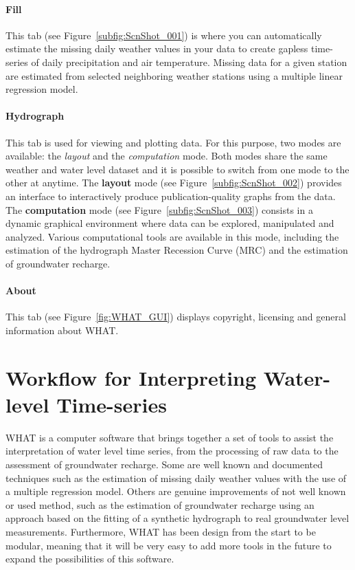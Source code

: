 \documentclass[WHATMANUAL.tex]{subfiles}
\begin{document}
\paragraph{Fill} This tab (see Figure~\ref{subfig:ScnShot_001}) is where you can automatically estimate the missing daily weather values in your data to create gapless time-series of daily precipitation and air temperature. Missing data for a given station are estimated from selected neighboring weather stations using a multiple linear regression model.

\paragraph{Hydrograph} This tab is used for viewing and plotting data. For this purpose, two modes are available: the \emph{layout} and the \emph{computation} mode. Both modes share the same weather and water level dataset and it is possible to switch from one mode to the other at anytime. The \textbf{layout} mode (see Figure~\ref{subfig:ScnShot_002}) provides an interface to interactively produce publication-quality graphs from the data. The \textbf{computation} mode (see Figure~\ref{subfig:ScnShot_003}) consists in a dynamic graphical environment where data can be explored, manipulated and analyzed. Various computational tools are available in this mode, including the estimation of the hydrograph Master Recession Curve (MRC) and the estimation of groundwater recharge.

\paragraph{About} This tab (see Figure~\ref{fig:WHAT_GUI}) displays copyright, licensing and general information about WHAT.

\section{Workflow for Interpreting Water-level Time-series}\label{sec:workflow}

WHAT is a computer software that brings together a set of tools to assist the interpretation of water level time series, from the processing of raw data to the assessment of groundwater recharge. Some are well known and documented techniques such as the estimation of missing daily weather values with the use of a multiple regression model. Others are genuine improvements of not well known or used method, such as the estimation of groundwater recharge using an approach based on the fitting of a synthetic hydrograph to real groundwater level measurements. Furthermore, WHAT has been design from the start to be modular, meaning that it will be very easy to add more tools in the future to expand the possibilities of this software.
\end{document}
